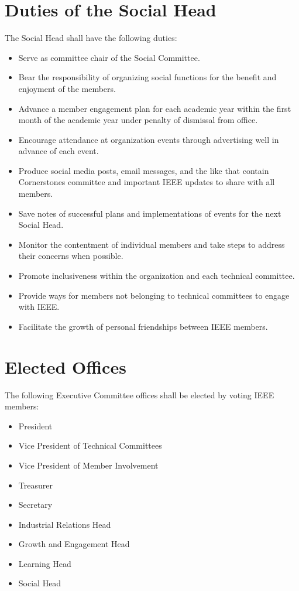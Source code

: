 \documentclass[12pt]{constitution}
\begin{document}
\section{Duties of the Social Head}
\label{sec:officer_soc}
The Social Head shall have the following duties:
\begin{itemize}
    \item Serve as committee chair of the Social Committee.
    \item Bear the responsibility of organizing social functions for the benefit and enjoyment of the members.
    \item Advance a member engagement plan for each academic year within the first month of the academic year under penalty of dismissal from office.
    \item Encourage attendance at organization events through advertising well in advance of each event.
    \item Produce social media posts, email messages, and the like that contain Cornerstones committee and important IEEE updates to share with all members.
    \item Save notes of successful plans and implementations of events for the next Social Head.
    \item Monitor the contentment of individual members and take steps to address their concerns when possible.
    \item Promote inclusiveness within the organization and each technical committee.
    \item Provide ways for members not belonging to technical committees to engage with IEEE.
    \item Facilitate the growth of personal friendships between IEEE members.
\end{itemize}


\label{art:elect}

\section{Elected Offices}
\label{sec:elect_list}
The following Executive Committee offices shall be elected by voting IEEE members:
\begin{itemize}
    \item President
    \item Vice President of Technical Committees
    \item Vice President of Member Involvement
    \item Treasurer
    \item Secretary
    \item Industrial Relations Head
    \item Growth and Engagement Head
    \item Learning Head
    \item Social Head
\end{itemize}
\end{document}
